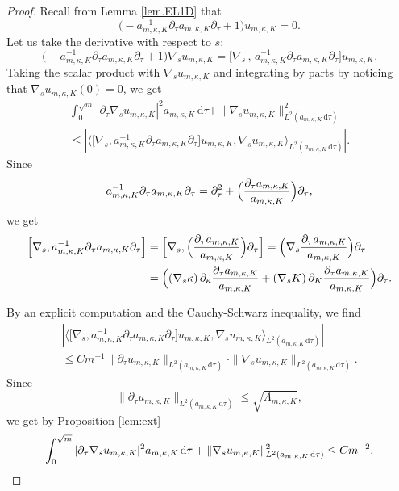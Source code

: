 \documentclass[JEP,XML,SOM,Unicode]{cedram}
\theoremstyle{plain}
\theoremstyle{definition}
\newcommand{\dx}{\mathrm{\,d}}
\let\pa\partial
\begin{document}
\begin{proof}
Recall from Lemma \ref{lem.EL1D} that
\[\bigl(- a^{-1}_{m,\kappa,K}\partial_\tau a_{m,\kappa,K}\partial_\tau
+1\bigr)u_{m,\kappa, K}=0.\]
Let us take the derivative with respect to $s$:
\[\bigl(- a^{-1}_{m,\kappa,K}\partial_\tau a_{m,\kappa,K}\partial_\tau
+1 \bigr)\nabla_{s} u_{m,\kappa, K}= \bigl[\nabla_{s}\,,\,a^{-1}_{m,\kappa,K}\partial_\tau a_{m,\kappa,K}\partial_\tau \bigr]u_{m,\kappa, K}.\]
Taking the scalar product with $\nabla_{s} u_{m,\kappa, K}$ and integrating by parts by noticing that $\nabla_{s} u_{m,\kappa, K}(0)=0$, we get
\begin{multline*}
\int_{0}^{\sqrt{m}} |\partial_{\tau} \nabla_{s}u_{m,\kappa, K}|^2a_{m,\kappa, K}\dx\tau+\|\nabla_{s} u_{m,\kappa, K}\|^2_{L^2(a_{m,\kappa,K}\dx\tau)}\\
\leq \left|\bigl\langle \bigl[\nabla_{s},a^{-1}_{m,\kappa,K}\partial_\tau a_{m,\kappa,K}\partial_\tau \bigr]u_{m,\kappa, K},\nabla_{s} u_{m,\kappa, K} \bigr\rangle_{L^2(a_{m,\kappa, K}\dx\tau)}\right|.
\end{multline*}
Since
\[
a^{-1}_{m,\kappa,K}\partial_\tau a_{m,\kappa,K}\partial_\tau = \pa_\tau^2 + \Bigl(\frac{\pa_\tau a_{m,\kappa,K}}{a_{m,\kappa,K}}\Bigr)\pa_\tau,
\]
we get
\[\begin{split}
\Bigl[\nabla_{s},a^{-1}_{m,\kappa,K}\partial_\tau a_{m,\kappa,K}\partial_\tau\Bigr]
&= \Bigl[\nabla_{s}, \Bigl(\frac{\pa_\tau a_{m,\kappa,K}}{a_{m,\kappa,K}} \Bigr)\pa_\tau \Bigr]
= \Bigl(\nabla_s\frac{\pa_\tau a_{m,\kappa,K}}{a_{m,\kappa,K}} \Bigr)\pa_\tau
\\&= \Bigl(
\left(\nabla_s \kappa\right)\pa_\kappa\frac{\pa_\tau a_{m,\kappa,K}}{a_{m,\kappa,K}}
+\left(\nabla_s K\right)\pa_K\frac{\pa_\tau a_{m,\kappa,K}}{a_{m,\kappa,K}}
\Bigr)\pa_\tau.
\end{split}\]

By an explicit computation and the Cauchy-Schwarz inequality, we find
\begin{multline*}
\left| \bigl\langle \bigl[\nabla_{s},a^{-1}_{m,\kappa,K}\partial_\tau a_{m,\kappa,K}\partial_\tau \bigr]u_{m,\kappa, K},\nabla_{s} u_{m,\kappa, K} \bigr\rangle_{L^2(a_{m,\kappa, K}\dx\tau)}\right|\\
\leq Cm^{-1}\|\partial_{\tau}u_{m,\kappa,K}\|_{L^2(a_{m,\kappa, K}\dx\tau)}\cdot\|\nabla_{s}u_{m,\kappa, K}\|_{L^2(a_{m,\kappa, K}\dx\tau)}.
\end{multline*}
Since
\[\|\partial_{\tau}u_{m,\kappa,K}\|_{L^2(a_{m,\kappa, K}\dx\tau)}\leq \sqrt{\Lambda_{m,\kappa, K}},\]
we get by Proposition \ref{lem:ext}
\[\int_{0}^{\sqrt{m}} |\partial_{\tau} \nabla_{s}u_{m,\kappa, K}|^2a_{m,\kappa, K}\dx\tau+\|\nabla_{s} u_{m,\kappa, K}\|^2_{L^2(a_{m,\kappa,K}\dx\tau)}\leq Cm^{-2}.\qedhere\]
\end{proof}
\end{document}
